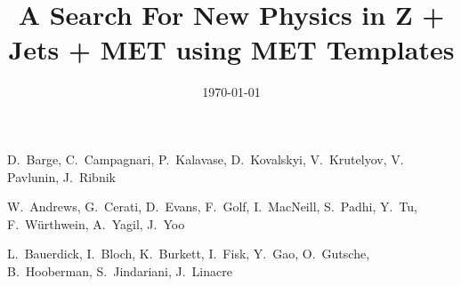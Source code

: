 \documentclass{cmspaper}
\begin{document}
\begin{titlepage}


  \date{\today}
 
  \title{A Search For New Physics in Z + Jets + MET using MET Templates}

  \begin{Authlist}
    D.~Barge, C.~Campagnari, P.~Kalavase, D.~Kovalskyi, V.~Krutelyov, V. Pavlunin, J.~Ribnik

    W.~Andrews, G.~Cerati, D.~Evans, F.~Golf, I.~MacNeill, S.~Padhi, Y.~Tu, F.~W\"urthwein, 
	A.~Yagil, J.~Yoo

	L.~Bauerdick, I.~Bloch, K.~Burkett, I.~Fisk, Y.~Gao, O.~Gutsche, B.~Hooberman, 
	S.~Jindariani, J.~Linacre
  \end{Authlist}

  \begin{abstract}

\begin{comment}

We search for new physics in the dilepton final state of Z plus two or more jets plus 
missing transverse 
energy (MET) in the $\sqrt{s}$ = 7~TeV data in 2011 (976~pb$^{-1}$). 
The Z boson is reconstructed in its decay to $e^+e^-$ or $\mu^+\mu^-$, and
the search regions are defined as MET $\ge$ 100 GeV (loose signal region) and 
MET $\ge$ 200 GeV (tight signal region). 
We use data driven techniques to predict the standard model background in these
search regions. 
Contributions from Drell-Yan production combined with detector mis-measurements that produce
fake MET are modeled via MET templates.
Top pair production background, as well as other backgrounds for which the lepton
flavors are uncorrelated, are modeled via $e^\pm\mu^\mp$ subtraction.
We find no evidence
for anomalous yield beyond SM expectations and place upper limits
on the non SM yields in the signal regions
and model dependent limits on LM4 and LM8 which show that LM4 is ruled out.

\end{comment}



\end{abstract}
\end{titlepage}
\end{document}
